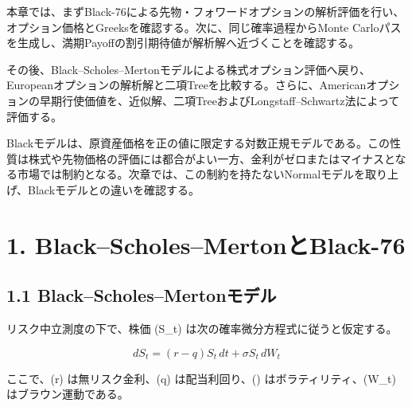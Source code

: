 \documentclass[
  letterpaper,
  DIV=11,
  numbers=noendperiod]{scrreprt}
\newenvironment{Shaded}{\begin{snugshade}}{\end{snugshade}}
\newcommand{\AttributeTok}[1]{\textcolor[rgb]{0.40,0.45,0.13}{#1}}
\newcommand{\ConstantTok}[1]{\textcolor[rgb]{0.56,0.35,0.01}{#1}}
\newcommand{\FunctionTok}[1]{\textcolor[rgb]{0.28,0.35,0.67}{#1}}
\newcommand{\NormalTok}[1]{\textcolor[rgb]{0.00,0.23,0.31}{#1}}
\newcommand{\SpecialCharTok}[1]{\textcolor[rgb]{0.37,0.37,0.37}{#1}}
\newcommand{\StringTok}[1]{\textcolor[rgb]{0.13,0.47,0.30}{#1}}
\begin{document}
本章では、まずBlack-76による先物・フォワードオプションの解析評価を行い、オプション価格とGreeksを確認する。次に、同じ確率過程からMonte
Carloパスを生成し、満期Payoffの割引期待値が解析解へ近づくことを確認する。

その後、Black--Scholes--Mertonモデルによる株式オプション評価へ戻り、Europeanオプションの解析解と二項Treeを比較する。さらに、Americanオプションの早期行使価値を、近似解、二項TreeおよびLongstaff--Schwartz法によって評価する。

Blackモデルは、原資産価格を正の値に限定する対数正規モデルである。この性質は株式や先物価格の評価には都合がよい一方、金利がゼロまたはマイナスとなる市場では制約となる。次章では、この制約を持たないNormalモデルを取り上げ、Blackモデルとの違いを確認する。

\begin{Shaded}
\end{Shaded}

\section{1.
Black--Scholes--MertonとBlack-76}\label{blackscholesmertonux3068black-76}

\subsection{1.1
Black--Scholes--Mertonモデル}\label{blackscholesmertonux30e2ux30c7ux30eb}

リスク中立測度の下で、株価 (S\_t) は次の確率微分方程式に従うと仮定する。

\[
dS_t
=
(r-q)S_t\,dt
+
\sigma S_t\,dW_t
\]

ここで、(r) は無リスク金利、(q) は配当利回り、(\sigma)
はボラティリティ、(W\_t) はブラウン運動である。
\end{document}

